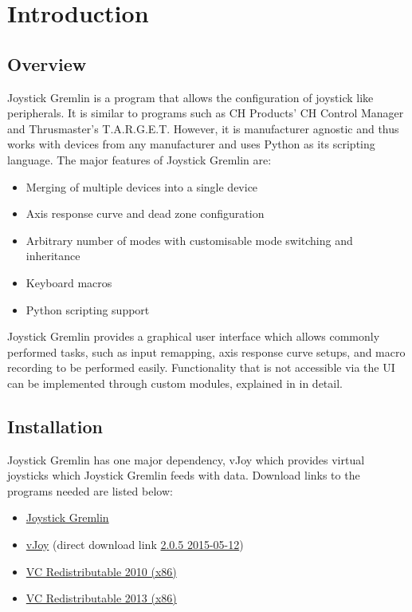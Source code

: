 \documentclass[a4, 10pt]{article}
\newcommand{\JG}{Joystick Gremlin}
\begin{document}


\tableofcontents
\newpage


\section{Introduction}
\label{sec:introduction}


\subsection{Overview}

\JG{} is a program that allows the configuration of joystick like
peripherals. It is similar to programs such as CH Products' CH Control
Manager and Thrusmaster's T.A.R.G.E.T. However, it is manufacturer
agnostic and thus works with devices from any manufacturer and uses
Python as its scripting language. The major features of Joystick Gremlin
are:
\begin{itemize}
    \item Merging of multiple devices into a single device
    \item Axis response curve and dead zone configuration
    \item Arbitrary number of modes with customisable mode switching and
        inheritance
    \item Keyboard macros
    \item Python scripting support
\end{itemize}

\JG{} provides a graphical user interface which allows commonly
performed tasks, such as input remapping, axis response curve setups,
and macro recording to be performed easily. Functionality that is not
accessible via the UI can be implemented through custom modules,
explained in  in detail.


\subsection{Installation}
\JG{} has one major dependency, vJoy which provides virtual joysticks
which \JG{} feeds with data. Download links to the programs needed are
listed below:
\begin{itemize}
    \item \href{https://github.com/WhiteMagic/JoystickGremlin}{\JG{}}
    \item \href{http://vjoystick.sourceforge.net/site/}{vJoy} (direct
        download link
        \href{http://sourceforge.net/projects/vjoystick/files/Beta%202.x/2.0.5-120515/vJoy_205_050515.exe/download}{2.0.5
        2015-05-12})
    \item
        \href{http://www.microsoft.com/en-us/download/details.aspx?id=5555}{VC
        Redistributable  2010 (x86)}
    \item
        \href{http://www.microsoft.com/en-us/download/details.aspx?id=40784}{VC
        Redistributable 2013 (x86)}
\end{itemize}
\end{document}
